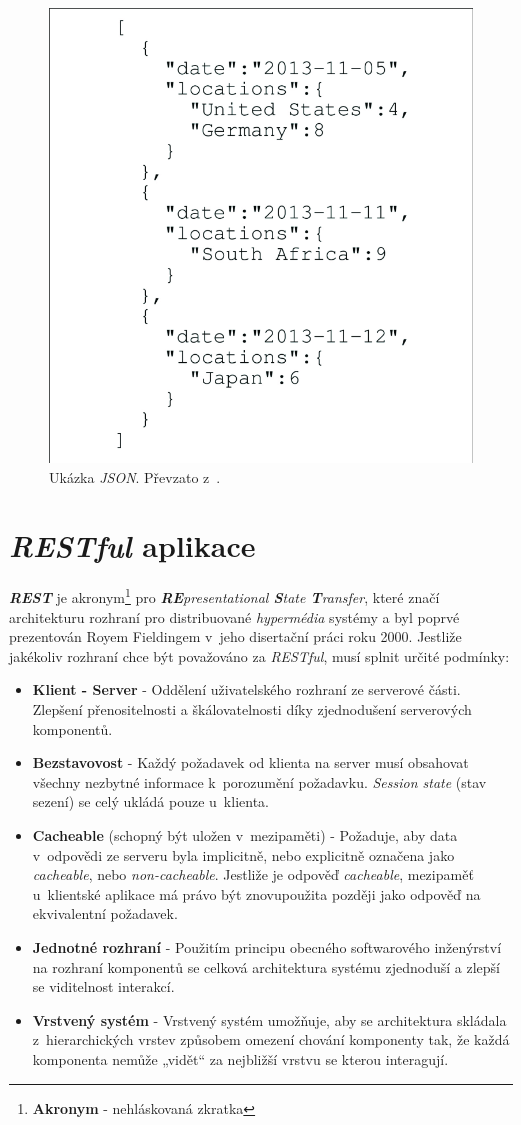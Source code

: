\begin{figure}[hbt]
  \centering
  \includegraphics[width=.45 \linewidth]{obrazky-figures/json_example.png}
  \caption{Ukázka \emph{JSON}. Převzato z~\cite{json:example}.}
  \label{figure:json}
\end{figure}

\newpage
\section{\emph{RESTful} aplikace}
\label{terminy:restful}
\textbf{\emph{REST}} je akronym\footnote{\textbf{Akronym} - nehláskovaná zkratka} pro \emph{\textbf{RE}presentational \textbf{S}tate \textbf{T}ransfer},
které značí architekturu rozhraní pro distribuované \emph{hypermédia} systémy a byl poprvé prezentován Royem Fieldingem v~jeho disertační práci roku 2000.
\newline
\newline
Jestliže jakékoliv rozhraní chce být považováno za \emph{RESTful}, musí splnit určité podmínky:
\begin{itemize}
  \item \textbf{Klient - Server} - Oddělení uživatelského rozhraní ze serverové části.
        Zlepšení přenositelnosti a škálovatelnosti díky zjednodušení serverových komponentů.
  \item \textbf{Bezstavovost} - Každý požadavek od klienta na server musí obsahovat všechny nezbytné informace k~porozumění požadavku.
        \emph{Session state} (stav sezení) se celý ukládá pouze u~klienta.
  \item \textbf{Cacheable} (schopný být uložen v~mezipaměti) - Požaduje, aby data v~odpovědi ze serveru byla implicitně, nebo explicitně označena jako \emph{cacheable}, nebo \emph{non-cacheable}.
        Jestliže je odpověď \emph{cacheable}, mezipaměť u~klientské aplikace má právo být znovupoužita později jako odpověď na ekvivalentní požadavek.
  \item \textbf{Jednotné rozhraní} - Použitím principu obecného softwarového inženýrství na rozhraní komponentů se celková architektura systému zjednoduší a zlepší se viditelnost interakcí.
  \item \textbf{Vrstvený systém} - Vrstvený systém umožňuje, aby se architektura skládala z~hierarchických vrstev způsobem omezení chování komponenty tak, že každá komponenta nemůže „vidět“ za nejbližší vrstvu se kterou interagují.
\end{itemize}

